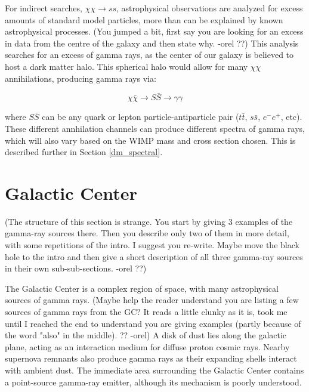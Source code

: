     For indirect searches, $\chi\chi \rightarrow ss$, astrophysical observations are analyzed for excess amounts of standard model particles, more than can be explained by known astrophysical processes.
    {\color{red}(You jumped a bit, first say you are looking for an excess in data from the centre of the galaxy and then state why. -orel ??)}
    This analysis searches for an excess of gamma rays, as the center of our galaxy is believed to host a dark matter halo.
    This spherical halo would allow for many $\chi\chi$ annihilations, producing gamma rays via: 
    
    $$\chi\bar{\chi} \rightarrow S\bar{S} \rightarrow \gamma\gamma$$

    where $S\bar{S}$ can be any quark or lepton particle-antiparticle pair ($t\bar{t}$, $s\bar{s}$, $e^{-}e^{+}$, etc).
    These different annhilation channels can produce different spectra of gamma rays, which will also vary based on the WIMP mass and cross section chosen.
    This is described further in Section \ref{dm_spectral}.

\FloatBarrier

\section{Galactic Center}
  
  {\color{red}(The structure of this section is strange. You start by giving 3 examples of the gamma-ray sources there. Then you describe only two of them in more detail, with some repetitions of the intro. I suggest you re-write. Maybe move the black hole to the intro and then give a short description of all three gamma-ray sources in their own sub-sub-sections. -orel ??)}

  The Galactic Center is a complex region of space, with many astrophysical sources of gamma rays.
  {\color{red}(Maybe help the reader understand you are listing a few sources of gamma rays from the GC? It reads a little clunky as it is, took me until I reached the end to understand you are giving examples (partly because of the word "also" in the middle). ?? -orel)}
  A disk of dust lies along the galactic plane, acting as an interaction medium for diffuse proton cosmic rays.
  Nearby supernova remnants also produce gamma rays as their expanding shells interact with ambient dust.
  The immediate area surrounding the Galactic Center contains a point-source gamma-ray emitter, although its mechanism is poorly understood.

